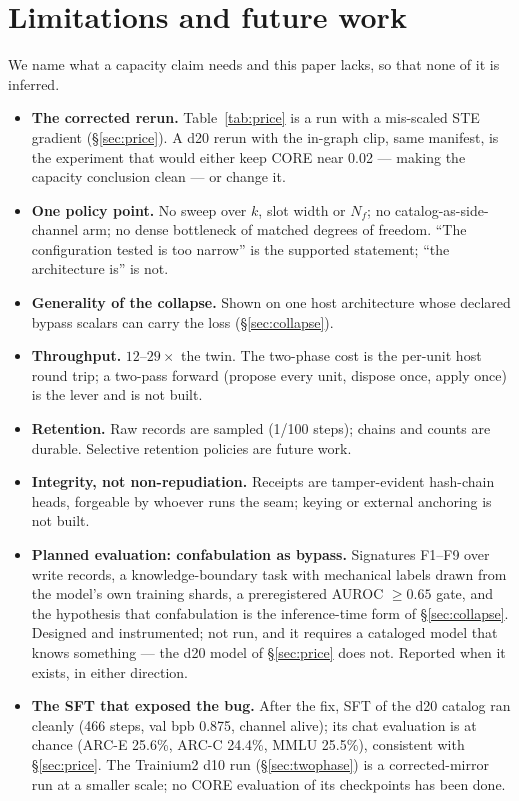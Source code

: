 \documentclass[10pt,twocolumn]{article}
\begin{document}
\section{Limitations and future work}
\label{sec:future}

We name what a capacity claim needs and this paper lacks, so that none of it
is inferred.
\begin{itemize}\itemsep1pt
  \item \textbf{The corrected rerun.} Table~\ref{tab:price} is a run with a
  mis-scaled STE gradient (\S\ref{sec:price}). A d20 rerun with the in-graph
  clip, same manifest, is the experiment that would either keep CORE near
  0.02 --- making the capacity conclusion clean --- or change it.
  \item \textbf{One policy point.} No sweep over $k$, slot width or
  $N_f$; no catalog-as-side-channel arm; no dense bottleneck of matched
  degrees of freedom. ``The configuration tested is too narrow'' is the
  supported statement; ``the architecture is'' is not.
  \item \textbf{Generality of the collapse.} Shown on one host architecture
  whose declared bypass scalars can carry the loss (\S\ref{sec:collapse}).
  \item \textbf{Throughput.} $12$--$29\times$ the twin. The two-phase cost
  is the per-unit host round trip; a two-pass forward (propose every unit,
  dispose once, apply once) is the lever and is not built.
  \item \textbf{Retention.} Raw records are sampled (1/100 steps); chains
  and counts are durable. Selective retention policies are future work.
  \item \textbf{Integrity, not non-repudiation.} Receipts are tamper-evident
  hash-chain heads, forgeable by whoever runs the seam; keying or external
  anchoring is not built.
  \item \textbf{Planned evaluation: confabulation as bypass.} Signatures
  F1--F9 over write records, a knowledge-boundary task with mechanical labels
  drawn from the model's own training shards, a preregistered AUROC $\ge
  0.65$ gate, and the hypothesis that confabulation is the inference-time
  form of \S\ref{sec:collapse}. Designed and instrumented; not run, and it
  requires a cataloged model that knows something --- the d20 model of
  \S\ref{sec:price} does not. Reported when it exists, in either direction.
  \item \textbf{The SFT that exposed the bug.} After the fix, SFT of the d20
  catalog ran cleanly (466 steps, val bpb 0.875, channel alive); its chat
  evaluation is at chance (ARC-E 25.6\%, ARC-C 24.4\%, MMLU 25.5\%),
  consistent with \S\ref{sec:price}. The Trainium2 d10 run
  (\S\ref{sec:twophase}) is a corrected-mirror run at a smaller scale; no
  CORE evaluation of its checkpoints has been done.
\end{itemize}
\end{document}
